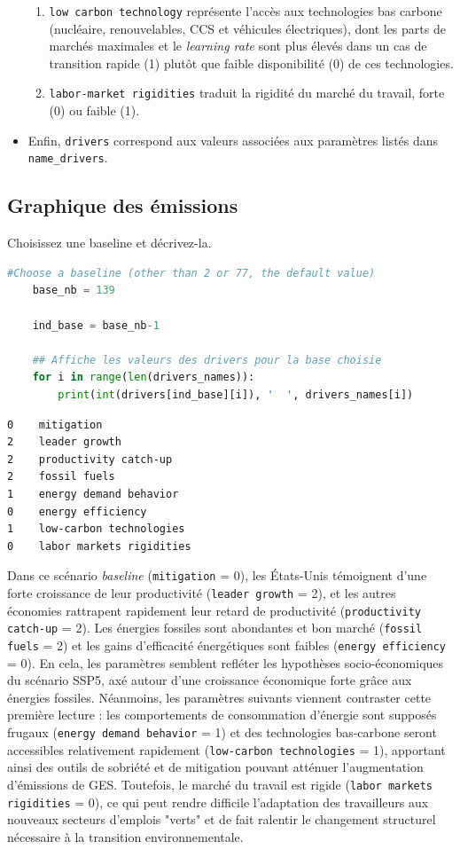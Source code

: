 \documentclass[a4,11pt]{aleph-notas}
\newcommand{\ans}[1]{
\begin{mdframed}[
    roundcorner=10pt,     %
    backgroundcolor=gray!20, %
    linecolor=black,      %
    linewidth=1pt,        %
    innertopmargin=10pt,  %
    innerbottommargin=10pt, %
    innerleftmargin=10pt,  %
    innerrightmargin=10pt  %
]
#1
\end{mdframed}
}
\begin{document}
\begin{itemize}
\begin{enumerate}
    \item \texttt{low carbon technology} représente l'accès aux technologies bas carbone (nucléaire, renouvelables, CCS et véhicules électriques), dont les parts de marchés maximales et le \textit{learning rate} sont plus élevés dans un cas de transition rapide (1) plutôt que faible disponibilité (0) de ces technologies.
    \item \texttt{labor-market rigidities} traduit la rigidité du marché du travail, forte (0) ou faible (1).  
\end{enumerate}
\item Enfin, \texttt{drivers} correspond aux valeurs associées aux paramètres listés dans \texttt{name\_drivers}.
\end{itemize}

\subsection{Graphique des émissions}
\ans{Choisissez une baseline et décrivez-la.}
\begin{lstlisting}[language=Python]
    #Choose a baseline (other than 2 or 77, the default value)
    base_nb = 139
    
    ind_base = base_nb-1
    
    ## Affiche les valeurs des drivers pour la base choisie 
    for i in range(len(drivers_names)):
        print(int(drivers[ind_base][i]), '  ', drivers_names[i])
\end{lstlisting}

\begin{verbatim}
0    mitigation
2    leader growth
2    productivity catch-up
2    fossil fuels
1    energy demand behavior
0    energy efficiency
1    low-carbon technologies
0    labor markets rigidities
\end{verbatim}

Dans ce scénario \textit{baseline} (\texttt{mitigation} = 0), les États-Unis témoignent d'une forte croissance de leur productivité (\texttt{leader growth} = 2), et les autres économies rattrapent rapidement leur retard de productivité (\texttt{productivity catch-up} = 2). Les énergies fossiles sont abondantes et bon marché (\texttt{fossil fuels} = 2) et les gains d'efficacité énergétiques sont faibles (\texttt{energy efficiency} = 0). En cela, les paramètres semblent refléter les hypothèses socio-économiques du scénario SSP5, axé autour d'une croissance économique forte grâce aux énergies fossiles. Néanmoins, les paramètres suivants viennent contraster cette première lecture : les comportements de consommation d'énergie sont supposés frugaux (\texttt{energy demand behavior} = 1) et des technologies bas-carbone seront accessibles relativement rapidement (\texttt{low-carbon technologies} = 1), apportant ainsi des outils de sobriété et de mitigation pouvant atténuer l'augmentation d'émissions de GES. Toutefois, le marché du travail est rigide (\texttt{labor markets rigidities} = 0), ce qui peut rendre difficile l'adaptation des travailleurs aux nouveaux secteurs d'emplois "verts" et de fait ralentir le changement structurel nécessaire à la transition environnementale. \\
\end{document}
